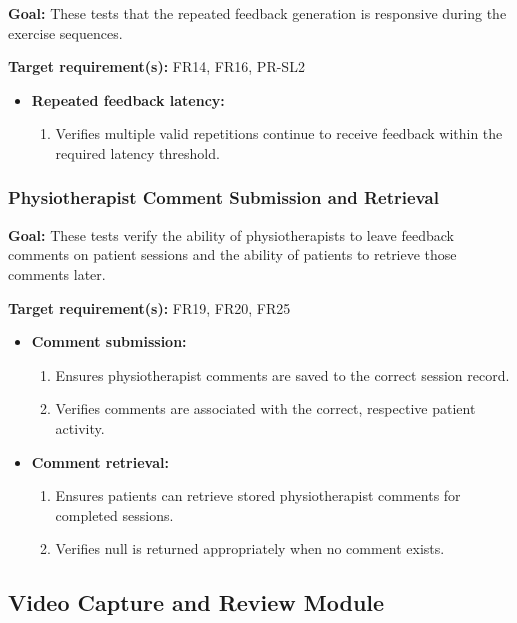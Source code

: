 \documentclass[12pt, titlepage]{article}
\begin{document}
\textbf{Goal:} These tests that the repeated feedback generation is responsive during the exercise sequences.

\textbf{Target requirement(s):} FR14, FR16, PR-SL2

\begin{itemize}
    \item \textbf{Repeated feedback latency:}
    \begin{enumerate}
        \item Verifies multiple valid repetitions continue to receive feedback within the required latency threshold.
    \end{enumerate}
\end{itemize}

\subsubsection{Physiotherapist Comment Submission and Retrieval}

\textbf{Goal:} These tests verify the ability of physiotherapists to leave feedback comments on patient sessions and the ability of patients to retrieve those comments later.

\textbf{Target requirement(s):} FR19, FR20, FR25

\begin{itemize}
    \item \textbf{Comment submission:}
    \begin{enumerate}
        \item Ensures physiotherapist comments are saved to the correct session record.
        \item Verifies comments are associated with the correct, respective patient activity.
    \end{enumerate}

    \item \textbf{Comment retrieval:}
    \begin{enumerate}
        \item Ensures patients can retrieve stored physiotherapist comments for completed sessions.
        \item Verifies null is returned appropriately when no comment exists.
    \end{enumerate}
\end{itemize}

\subsection{Video Capture and Review Module}
\end{document}
